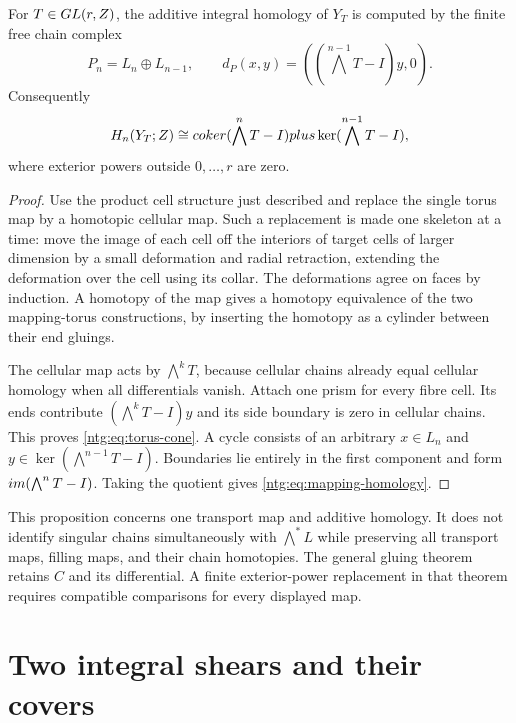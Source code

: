\begin{proposition}\label{ntg:prop:mappingtorus}
For $T\in GL(r,Z)$, the additive integral homology of
$Y_T$ is computed by the finite free chain complex
\begin{equation}\label{ntg:eq:torus-cone}
 P_n=L_n\oplus L_{n-1},\qquad
 d_P(x,y)=((\bigwedge^{n-1}T-I)y,0).
\end{equation}
Consequently
\begin{equation}\label{ntg:eq:mapping-homology}
 H_n(Y_T;Z)\cong
 coker(\bigwedge^nT-I)plus
 \ker(\bigwedge^{n-1}T-I),
\end{equation}
where exterior powers outside $0,\ldots,r$ are zero.
\end{proposition}
\begin{proof}
Use the product cell structure just described and replace the single
torus map by a homotopic cellular map. Such a replacement is made
one skeleton at a time: move the image of each cell off the interiors
of target cells of larger dimension by a small deformation and radial
retraction, extending the deformation over the cell using its collar.
The deformations agree on faces by induction. A homotopy of the map
gives a homotopy equivalence of the two mapping-torus constructions,
by inserting the homotopy as a cylinder between their end gluings.

The cellular map acts by $\bigwedge^kT$, because cellular chains
already equal cellular homology when all differentials vanish.
Attach one prism for every fibre cell. Its ends contribute
$(\bigwedge^kT-I)y$ and its side boundary is zero in cellular
chains. This proves \eqref{ntg:eq:torus-cone}. A cycle consists of an
arbitrary $x\in L_n$ and $y\in\ker(\bigwedge^{n-1}T-I)$.
Boundaries lie entirely in the first component and form
$im(\bigwedge^nT-I)$. Taking the quotient gives
\eqref{ntg:eq:mapping-homology}.
\end{proof}

This proposition concerns one transport map and additive homology.
It does not identify singular chains simultaneously with
$\bigwedge^*L$ while preserving all transport maps, filling maps,
and their chain homotopies. The general gluing theorem retains $C$
and its differential. A finite exterior-power replacement in that
theorem requires compatible comparisons for every displayed map.

\section{Two integral shears and their covers}\label{ntg:sec:shears}

